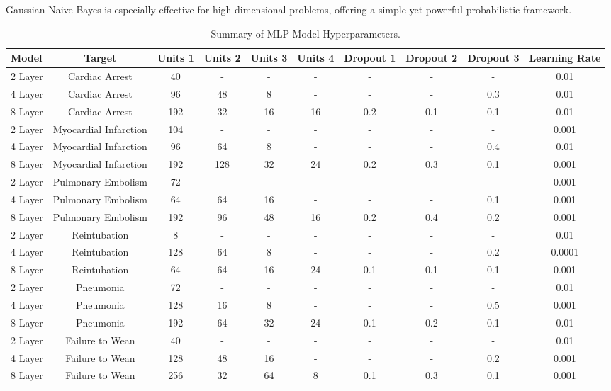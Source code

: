 \documentclass[bst/sn-nature]{sn-jnl}
\begin{document}
\begin{multicols}{2}
Gaussian Naive Bayes is especially effective for high-dimensional problems, offering a simple yet powerful probabilistic framework.

\begin{table}
    \centering
    \small %
    \setlength{\tabcolsep}{2pt}
    \begin{tabular}{|l|c|c|c|c|c|c|c|c|c|}
    \hline
    \textbf{Model} & \textbf{Target} & \textbf{Units 1} & \textbf{Units 2} & \textbf{Units 3} & \textbf{Units 4} & \textbf{Dropout 1} & \textbf{Dropout 2} & \textbf{Dropout 3} & \textbf{Learning Rate} \\
    \hline
    \rowcolor[gray]{0.9} 2 Layer & Cardiac Arrest & 40 & - & - & - & - & - & - & 0.01 \\
    4 Layer & Cardiac Arrest & 96 & 48 & 8 & - & - & - & 0.3 & 0.01 \\
    \rowcolor[gray]{0.9} 8 Layer & Cardiac Arrest & 192 & 32 & 16 & 16 & 0.2 & 0.1 & 0.1 & 0.01 \\
    2 Layer & Myocardial Infarction & 104 & - & - & - & - & - & - & 0.001 \\
    \rowcolor[gray]{0.9} 4 Layer & Myocardial Infarction & 96 & 64 & 8 & - & - & - & 0.4 & 0.01 \\
    8 Layer & Myocardial Infarction & 192 & 128 & 32 & 24 & 0.2 & 0.3 & 0.1 & 0.001 \\
    \rowcolor[gray]{0.9} 2 Layer & Pulmonary Embolism & 72 & - & - & - & - & - & - & 0.001 \\
    4 Layer & Pulmonary Embolism & 64 & 64 & 16 & - & - & - & 0.1 & 0.001 \\
    \rowcolor[gray]{0.9} 8 Layer & Pulmonary Embolism & 192 & 96 & 48 & 16 & 0.2 & 0.4 & 0.2 & 0.001 \\
    2 Layer & Reintubation & 8 & - & - & - & - & - & - & 0.01 \\
    \rowcolor[gray]{0.9} 4 Layer & Reintubation & 128 & 64 & 8 & - & - & - & 0.2 & 0.0001 \\
    8 Layer & Reintubation & 64 & 64 & 16 & 24 & 0.1 & 0.1 & 0.1 & 0.001 \\
    \rowcolor[gray]{0.9} 2 Layer & Pneumonia & 72 & - & - & - & - & - & - & 0.01 \\
    4 Layer & Pneumonia & 128 & 16 & 8 & - & - & - & 0.5 & 0.001 \\
    \rowcolor[gray]{0.9} 8 Layer & Pneumonia & 192 & 64 & 32 & 24 & 0.1 & 0.2 & 0.1 & 0.01 \\
    2 Layer & Failure to Wean & 40 & - & - & - & - & - & - & 0.01 \\
    \rowcolor[gray]{0.9} 4 Layer & Failure to Wean & 128 & 48 & 16 & - & - & - & 0.2 & 0.001 \\
    8 Layer & Failure to Wean & 256 & 32 & 64 & 8 & 0.1 & 0.3 & 0.1 & 0.001 \\
    \hline
    \end{tabular}
    \caption{Summary of MLP Model Hyperparameters.}
    \label{tab:mlp_hyperparams}
\end{table}


\end{multicols}
\end{document}
